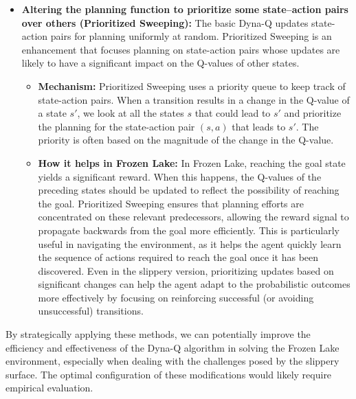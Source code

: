 \begin{itemize}
    \item \textbf{Altering the planning function to prioritize some state–action pairs over others (Prioritized Sweeping):}
    The basic Dyna-Q updates state-action pairs for planning uniformly at random. Prioritized Sweeping is an enhancement that focuses planning on state-action pairs whose updates are likely to have a significant impact on the Q-values of other states.
    \begin{itemize}
        \item \textbf{Mechanism:} Prioritized Sweeping uses a priority queue to keep track of state-action pairs. When a transition results in a change in the Q-value of a state $s'$, we look at all the states $s$ that could lead to $s'$ and prioritize the planning for the state-action pair $(s, a)$ that leads to $s'$. The priority is often based on the magnitude of the change in the Q-value.
        \item \textbf{How it helps in Frozen Lake:} In Frozen Lake, reaching the goal state yields a significant reward. When this happens, the Q-values of the preceding states should be updated to reflect the possibility of reaching the goal. Prioritized Sweeping ensures that planning efforts are concentrated on these relevant predecessors, allowing the reward signal to propagate backwards from the goal more efficiently. This is particularly useful in navigating the environment, as it helps the agent quickly learn the sequence of actions required to reach the goal once it has been discovered. Even in the slippery version, prioritizing updates based on significant changes can help the agent adapt to the probabilistic outcomes more effectively by focusing on reinforcing successful (or avoiding unsuccessful) transitions.
    \end{itemize}
\end{itemize}

By strategically applying these methods, we can potentially improve the efficiency and effectiveness of the Dyna-Q algorithm in solving the Frozen Lake environment, especially when dealing with the challenges posed by the slippery surface. The optimal configuration of these modifications would likely require empirical evaluation.

